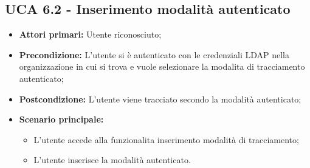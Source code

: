 \subsection{UCA 6.2 - Inserimento modalità autenticato}%
\begin{itemize}
	\item \textbf{Attori primari:} Utente riconosciuto;
	\item \textbf{Precondizione:} L'utente si è autenticato con le credenziali LDAP nella organizzazione in cui si trova e vuole selezionare la modalita di tracciamento autenticato;
	\item \textbf{Postcondizione:}  L'utente viene tracciato secondo la modalità autenticato;
	\item \textbf{Scenario principale:}
	\begin{itemize}
		\item L'utente accede alla funzionalita inserimento modalità di tracciamento;
		\item L'utente inserisce la modalità autenticato.
	\end{itemize}
\end{itemize}
